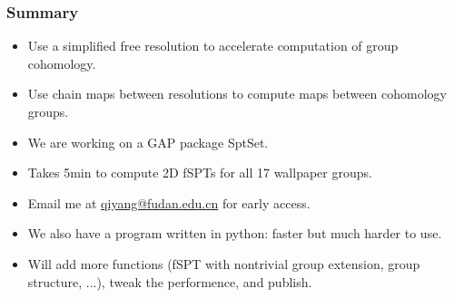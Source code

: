 \documentclass[xcolor=table, aspectratio=169]{beamer}
\begin{document}
\begin{frame}
	\frametitle{Summary}
	\begin{itemize}
		\item Use a simplified free resolution to accelerate computation of group cohomology.
		\item Use chain maps between resolutions to compute maps between cohomology groups.
		\item We are working on a GAP package SptSet.
		\item Takes 5min to compute 2D fSPTs for all 17 wallpaper groups.
		\item Email me at \url{qiyang@fudan.edu.cn} for early access.
		\item We also have a program written in python: faster but much harder to use.
		\item Will add more functions (fSPT with nontrivial group extension, group structure, ...), tweak the performence, and publish.
	\end{itemize}
\end{frame}
\end{document}
